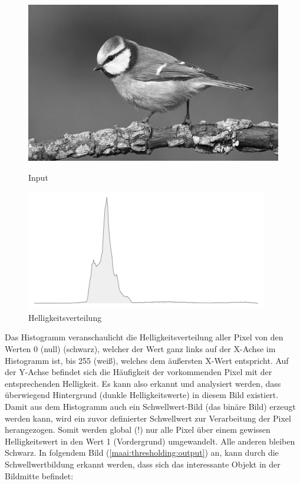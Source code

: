 \begin{figure}[htb]
    \centering
    \begin{minipage}[t]{0.45\linewidth}
        \centering
        \includegraphics[width=\linewidth]{pics/bildverarbeitungsalgos/grayscaling_output.png}
        \caption{Input}
        \label{maai:thresholding:input}
    \end{minipage}
    \hfill
    \begin{minipage}[t]{0.45\linewidth}
        \centering
        \includegraphics[width=\linewidth]{pics/bildverarbeitungsalgos/thresholding_histogram.png}
        \caption{Helligkeitsverteilung}
        \label{maai:thresholding:histogramm}
    \end{minipage}
\end{figure}

Das Histogramm veranschaulicht die Helligkeitsverteilung aller Pixel von den Werten 0 (null) (schwarz), welcher der Wert ganz links auf der X-Achse im Histogramm ist, bis 255 (weiß), welches dem äußersten X-Wert entspricht. Auf der Y-Achse befindet sich die Häufigkeit der vorkommenden Pixel mit der entsprechenden Helligkeit.
Es kann also erkannt und analysiert werden, dass überwiegend Hintergrund (dunkle Helligkeitswerte) in diesem Bild existiert. Damit aus dem Histogramm auch ein Schwellwert-Bild (das binäre Bild) erzeugt werden kann, wird ein zuvor definierter Schwellwert zur Verarbeitung der Pixel herangezogen. Somit werden global (!) nur alle Pixel über einem gewissen Helligkeitswert in den Wert 1 (Vordergrund) umgewandelt. Alle anderen bleiben Schwarz. In folgendem Bild (\ref{maai:thresholding:output}) an, kann durch die Schwellwertbildung erkannt werden, dass sich das interessante Objekt in der Bildmitte befindet:



